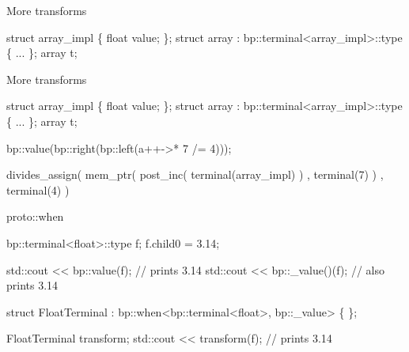 \begin{frame}[fragile]{More transforms}
\begin{semiverbatim}
struct array_impl \{ float value; \};
struct array : bp::terminal<array_impl>::type \{ ... \};
array t;












\end{semiverbatim}
\note{ }
\end{frame}


\begin{frame}[fragile]{More transforms}
\begin{semiverbatim}
struct array_impl \{ float value; \};
struct array : bp::terminal<array_impl>::type \{ ... \};
array t;

\alert<8>{bp::value(\alert<6>{bp::right(\alert<4>{bp::left(\alert<2>{\alert<5>{a++->* \alert<7,9>{7}} /= 4})})});}

\alert<3>{divides_assign(
\alert<5>{    mem_ptr(
        post_inc(
            terminal(array_impl)
        )
      , \alert<7>{terminal(\alert<9>{7})}
    )}
  , terminal(4)
)}
\end{semiverbatim}
\end{frame}


\begin{frame}[fragile]{proto::when}
\begin{semiverbatim}
bp::terminal<float>::type f;
f.child0 = 3.14;

std::cout << bp::value(f);    // prints 3.14
std::cout << bp::_value()(f); // also prints 3.14

struct FloatTerminal
: bp::when<bp::terminal<float>, bp::_value>
\{ \};

FloatTerminal transform;
std::cout << transform(f);  // prints 3.14




\end{semiverbatim}
\note{ }
\end{frame}

